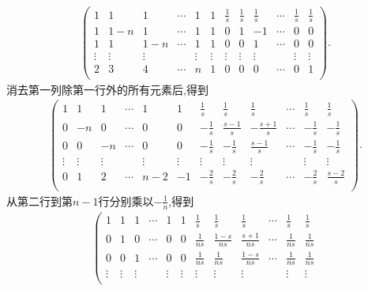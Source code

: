 \documentclass[../../main.tex]{subfiles}%
\begin{document}
\begin{solution}
\begin{gather*}
\left( \begin{matrix}
1&		1&		1&		\cdots&		1&		1&		\frac{1}{s}&		\frac{1}{s}&		\frac{1}{s}&		\cdots&		\frac{1}{s}&		\frac{1}{s}\\
1&		1-n&		1&		\cdots&		1&		1&		0&		1&		-1&		\cdots&		0&		0\\
1&		1&		1-n&		\cdots&		1&		1&		0&		0&		1&		\cdots&		0&		0\\
\vdots&		\vdots&		\vdots&		&		\vdots&		\vdots&		\vdots&		\vdots&		\vdots&		&		\vdots&		\vdots\\
2&		3&		4&		\cdots&		n&		1&		0&		0&		0&		\cdots&		0&		1\\
\end{matrix} \right) .
\end{gather*}
消去第一列除第一行外的所有元素后,得到
\begin{gather*}
\left( \begin{matrix}
1&		1&		1&		\cdots&		1&		1&		\frac{1}{s}&		\frac{1}{s}&		\frac{1}{s}&		\cdots&		\frac{1}{s}&		\frac{1}{s}\\
0&		-n&		0&		\cdots&		0&		0&		-\frac{1}{s}&		\frac{s-1}{s}&		-\frac{s+1}{s}&		\cdots&		-\frac{1}{s}&		-\frac{1}{s}\\
0&		0&		-n&		\cdots&		0&		0&		-\frac{1}{s}&		-\frac{1}{s}&		\frac{s-1}{s}&		\cdots&		-\frac{1}{s}&		-\frac{1}{s}\\
\vdots&		\vdots&		\vdots&		&		\vdots&		\vdots&		\vdots&		\vdots&		\vdots&		&		\vdots&		\vdots\\
0&		1&		2&		\cdots&		n-2&		-1&		-\frac{2}{s}&		-\frac{2}{s}&		-\frac{2}{s}&		\cdots&		-\frac{2}{s}&		\frac{s-2}{s}\\
\end{matrix} \right) .
\end{gather*}
从第二行到第\(n - 1\)行分别乘以\(-\frac{1}{n}\),得到
\begin{gather*}
\left( \begin{matrix}
1&		1&		1&		\cdots&		1&		1&		\frac{1}{s}&		\frac{1}{s}&		\frac{1}{s}&		\cdots&		\frac{1}{s}&		\frac{1}{s}\\
0&		1&		0&		\cdots&		0&		0&		\frac{1}{ns}&		\frac{1-s}{ns}&		\frac{s+1}{ns}&		\cdots&		\frac{1}{ns}&		\frac{1}{ns}\\
0&		0&		1&		\cdots&		0&		0&		\frac{1}{ns}&		\frac{1}{ns}&		\frac{1-s}{ns}&		\cdots&		\frac{1}{ns}&		\frac{1}{ns}\\
\vdots&		\vdots&		\vdots&		&		\vdots&		\vdots&		\vdots&		\vdots&		\vdots&		&		\vdots&		\vdots\\

\end{matrix}
\end{gather*}
\end{solution}
\end{document}

